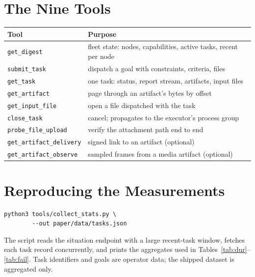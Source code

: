 \documentclass{article}
\begin{document}



\appendix

\section{The Nine Tools}

\begin{table}[h]
\centering
\small
\begin{tabular}{@{}p{}p{}@{}}
\toprule
Tool & Purpose \\
\midrule
\texttt{get\_digest} & fleet state: nodes, capabilities, active tasks, recent per node \\
\texttt{submit\_task} & dispatch a goal with constraints, criteria, files \\
\texttt{get\_task} & one task: status, report stream, artifacts, input files \\
\texttt{get\_artifact} & page through an artifact's bytes by offset \\
\texttt{get\_input\_file} & open a file dispatched with the task \\
\texttt{close\_task} & cancel; propagates to the executor's process group \\
\texttt{probe\_file\_upload} & verify the attachment path end to end \\
\texttt{get\_artifact\_delivery} & signed link to an artifact (optional) \\
\texttt{get\_artifact\_observe} & sampled frames from a media artifact (optional) \\
\bottomrule
\end{tabular}
\end{table}

\section{Reproducing the Measurements}

\begin{verbatim}
python3 tools/collect_stats.py \
        --out paper/data/tasks.json
\end{verbatim}

The script reads the situation endpoint with a large recent-task window, fetches each
task record concurrently, and prints the aggregates used in
Tables~\ref{tab:dur}--\ref{tab:fail}. Task identifiers and goals are operator data;
the shipped dataset is aggregated only.
\end{document}
